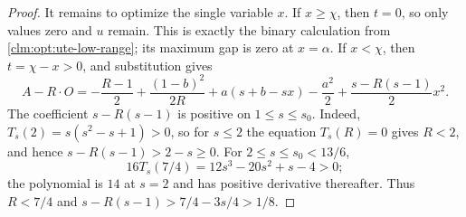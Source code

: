 \begin{proof}
It remains to optimize the single variable $x$.  If $x\ge\chi$, then $t=0$,
so only values zero and $u$ remain.  This is exactly the binary calculation
from \cref{clm:opt:ute-low-range}; its maximum gap is zero at
$x=\alpha$.  If $x<\chi$, then $t=\chi-x>0$, and substitution gives
\begin{equation}
 A-R\cdot O
 =-\frac{R-1}{2}+\frac{(1-b)^2}{2R}
  +a(s+b-sx)-\frac{a^2}{2}+\frac{s-R(s-1)}{2}x^2.
 \label{eq:opt:ute-positive-t}
\end{equation}
The coefficient $s-R(s-1)$ is positive on $1\le s\le s_0$.  Indeed,
$T_s(2)=s(s^2-s+1)>0$, so for $s\le2$ the equation $T_s(R)=0$ gives
$R<2$, and hence $s-R(s-1)>2-s\ge0$.  For
$2\le s\le s_0<13/6$,
\begin{equation}
 16T_s(7/4)=12s^3-20s^2+s-4>0;
\end{equation}
the polynomial is $14$ at $s=2$ and has positive derivative thereafter.
Thus $R<7/4$ and $s-R(s-1)>7/4-3s/4>1/8$.


\end{proof}
